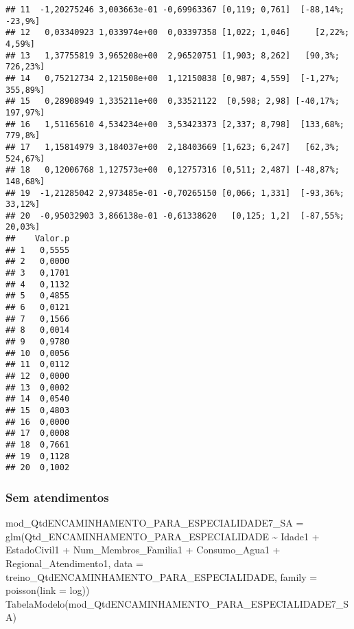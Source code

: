 \documentclass[
]{article}
\newenvironment{Shaded}{\begin{snugshade}}{\end{snugshade}}
\newcommand{\AttributeTok}[1]{\textcolor[rgb]{0.77,0.63,0.00}{#1}}
\newcommand{\FunctionTok}[1]{\textcolor[rgb]{0.00,0.00,0.00}{#1}}
\newcommand{\NormalTok}[1]{#1}
\newcommand{\OtherTok}[1]{\textcolor[rgb]{0.56,0.35,0.01}{#1}}
\newcommand{\SpecialCharTok}[1]{\textcolor[rgb]{0.00,0.00,0.00}{#1}}
\newcommand{\StringTok}[1]{\textcolor[rgb]{0.31,0.60,0.02}{#1}}
\begin{document}
\begin{verbatim}
## 11  -1,20275246 3,003663e-01 -0,69963367 [0,119; 0,761]  [-88,14%; -23,9%]
## 12   0,03340923 1,033974e+00  0,03397358 [1,022; 1,046]     [2,22%; 4,59%]
## 13   1,37755819 3,965208e+00  2,96520751 [1,903; 8,262]   [90,3%; 726,23%]
## 14   0,75212734 2,121508e+00  1,12150838 [0,987; 4,559]  [-1,27%; 355,89%]
## 15   0,28908949 1,335211e+00  0,33521122  [0,598; 2,98] [-40,17%; 197,97%]
## 16   1,51165610 4,534234e+00  3,53423373 [2,337; 8,798]  [133,68%; 779,8%]
## 17   1,15814979 3,184037e+00  2,18403669 [1,623; 6,247]   [62,3%; 524,67%]
## 18   0,12006768 1,127573e+00  0,12757316 [0,511; 2,487] [-48,87%; 148,68%]
## 19  -1,21285042 2,973485e-01 -0,70265150 [0,066; 1,331]  [-93,36%; 33,12%]
## 20  -0,95032903 3,866138e-01 -0,61338620   [0,125; 1,2]  [-87,55%; 20,03%]
##    Valor.p
## 1   0,5555
## 2   0,0000
## 3   0,1701
## 4   0,1132
## 5   0,4855
## 6   0,0121
## 7   0,1566
## 8   0,0014
## 9   0,9780
## 10  0,0056
## 11  0,0112
## 12  0,0000
## 13  0,0002
## 14  0,0540
## 15  0,4803
## 16  0,0000
## 17  0,0008
## 18  0,7661
## 19  0,1128
## 20  0,1002
\end{verbatim}

\hypertarget{sem-atendimentos-3}{%
\subsubsection{Sem atendimentos}\label{sem-atendimentos-3}}

\begin{Shaded}
\begin{Highlighting}[]
\NormalTok{mod\_QtdENCAMINHAMENTO\_PARA\_ESPECIALIDADE7\_SA }\OtherTok{=} 
  \FunctionTok{glm}\NormalTok{(Qtd\_ENCAMINHAMENTO\_PARA\_ESPECIALIDADE }\SpecialCharTok{\textasciitilde{}}\NormalTok{ Idade1 }\SpecialCharTok{+}\NormalTok{ EstadoCivil1 }\SpecialCharTok{+}\NormalTok{ Num\_Membros\_Familia1 }\SpecialCharTok{+} 
\NormalTok{        Consumo\_Agua1 }\SpecialCharTok{+} 
\NormalTok{        Regional\_Atendimento1, }\AttributeTok{data =}\NormalTok{ treino\_QtdENCAMINHAMENTO\_PARA\_ESPECIALIDADE, }\AttributeTok{family =} \FunctionTok{poisson}\NormalTok{(}\AttributeTok{link =} \StringTok{\textquotesingle{}log\textquotesingle{}}\NormalTok{))}
\FunctionTok{TabelaModelo}\NormalTok{(mod\_QtdENCAMINHAMENTO\_PARA\_ESPECIALIDADE7\_SA)}
\end{Highlighting}
\end{Shaded}
\end{document}
